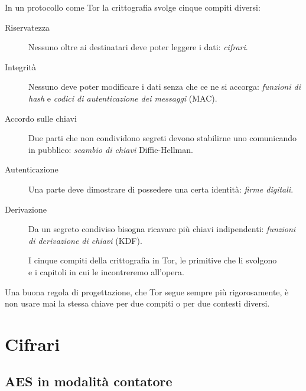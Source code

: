 In un protocollo come Tor la crittografia svolge cinque compiti diversi:
\begin{description}
  \item[Riservatezza] Nessuno oltre ai destinatari deve poter leggere i dati: \emph{cifrari}.
  \item[Integrità] Nessuno deve poter modificare i dati senza che ce ne si accorga: \emph{funzioni di hash} e \emph{codici di autenticazione dei messaggi} (MAC).
  \item[Accordo sulle chiavi] Due parti che non condividono segreti devono stabilirne uno comunicando in pubblico: \emph{scambio di chiavi} Diffie-Hellman.
  \item[Autenticazione] Una parte deve dimostrare di possedere una certa identità: \emph{firme digitali}.
  \item[Derivazione] Da un segreto condiviso bisogna ricavare più chiavi indipendenti: \emph{funzioni di derivazione di chiavi} (KDF).
\end{description}
\begin{figure}[htbp]
\centering

\caption{I cinque compiti della crittografia in Tor, le primitive che li svolgono e i capitoli in cui le incontreremo all'opera.}
\label{fig:compiti}
\end{figure}

Una buona regola di progettazione, che Tor segue sempre più rigorosamente, è non usare mai la stessa chiave per due compiti o per due contesti diversi.

\section{Cifrari}\label{sec:cripto-cifrari}

\subsection{AES in modalità contatore}

